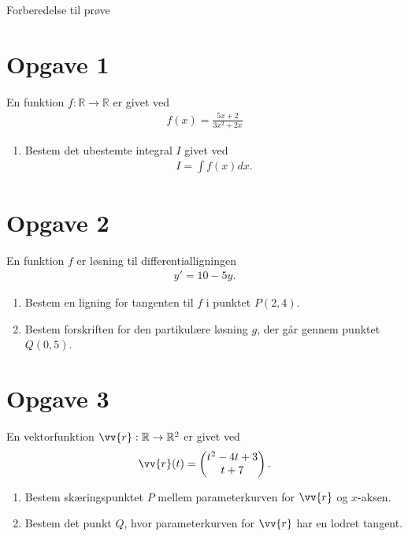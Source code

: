 
\begin{center}
	\Huge
	Forberedelse til prøve
\end{center}

\section*{Opgave 1}

En funktion $f: \mathbb{R} \to \mathbb{R}$ er givet ved
\begin{align*}
	f(x)= \frac{5x+2}{3x^2+2x}
\end{align*}
\begin{enumerate}[label=\roman*)]
	\item Bestem det ubestemte integral $I$ givet ved
	\begin{align*}
		I = \int f(x)dx.
	\end{align*}
\end{enumerate}

\section*{Opgave 2}
En funktion $f$ er løsning til differentialligningen
\begin{align*}
	y' = 10-5y.
\end{align*}
\begin{enumerate}[label=\roman*)]
	\item Bestem en ligning for tangenten til $f$ i punktet $P(2,4)$. 
	\item Bestem forskriften for den partikulære løsning $g$, der går gennem punktet $Q(0,5)$.
\end{enumerate}

\section*{Opgave 3}
En vektorfunktion $\vv{r}:\mathbb{R} \to \mathbb{R}^2$ er givet ved
\begin{align*}
	\vv{r}(t) = 
	\begin{pmatrix}
		t^2-4t+3 \\
		t+7
	\end{pmatrix}.
\end{align*} 
\begin{enumerate}[label=\roman*)]
	\item Bestem skæringspunktet $P$ mellem parameterkurven for $\vv{r}$ og $x$-aksen. 
	\item Bestem det punkt $Q$, hvor parameterkurven for $\vv{r}$ har en lodret tangent.
\end{enumerate}

